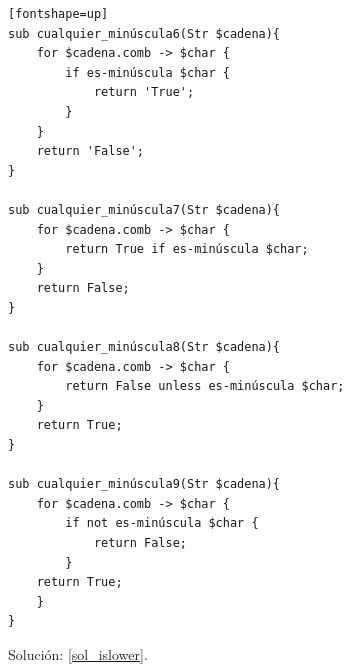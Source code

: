 \begin{exercise}
\begin{verbatim}[fontshape=up]
sub cualquier_minúscula6(Str $cadena){
    for $cadena.comb -> $char {
        if es-minúscula $char {
            return 'True';
        }
    }
    return 'False';
}

sub cualquier_minúscula7(Str $cadena){
    for $cadena.comb -> $char {
        return True if es-minúscula $char;
    }
    return False;
}

sub cualquier_minúscula8(Str $cadena){
    for $cadena.comb -> $char {
        return False unless es-minúscula $char;
    }
    return True;
}

sub cualquier_minúscula9(Str $cadena){
    for $cadena.comb -> $char {
        if not es-minúscula $char {
            return False;
        }
    return True;
    }
}
\end{verbatim}

Solución: \ref{sol_islower}.

\end{exercise}


